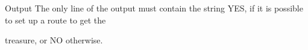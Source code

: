 Output
The only line of the output must contain the string YES, if it is possible to set up a route to get the

treasure, or NO otherwise.